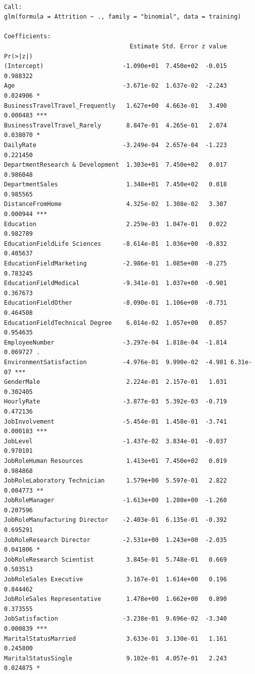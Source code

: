 \documentclass[
  letterpaper,
  DIV=11,
  numbers=noendperiod]{scrreprt}
\begin{document}
\begin{verbatim}

Call:
glm(formula = Attrition ~ ., family = "binomial", data = training)

Coefficients:
                                   Estimate Std. Error z value Pr(>|z|)    
(Intercept)                      -1.090e+01  7.450e+02  -0.015 0.988322    
Age                              -3.671e-02  1.637e-02  -2.243 0.024906 *  
BusinessTravelTravel_Frequently   1.627e+00  4.663e-01   3.490 0.000483 ***
BusinessTravelTravel_Rarely       8.847e-01  4.265e-01   2.074 0.038070 *  
DailyRate                        -3.249e-04  2.657e-04  -1.223 0.221450    
DepartmentResearch & Development  1.303e+01  7.450e+02   0.017 0.986048    
DepartmentSales                   1.348e+01  7.450e+02   0.018 0.985565    
DistanceFromHome                  4.325e-02  1.308e-02   3.307 0.000944 ***
Education                         2.259e-03  1.047e-01   0.022 0.982789    
EducationFieldLife Sciences      -8.614e-01  1.036e+00  -0.832 0.405637    
EducationFieldMarketing          -2.986e-01  1.085e+00  -0.275 0.783245    
EducationFieldMedical            -9.341e-01  1.037e+00  -0.901 0.367673    
EducationFieldOther              -8.090e-01  1.106e+00  -0.731 0.464508    
EducationFieldTechnical Degree    6.014e-02  1.057e+00   0.057 0.954635    
EmployeeNumber                   -3.297e-04  1.818e-04  -1.814 0.069727 .  
EnvironmentSatisfaction          -4.976e-01  9.990e-02  -4.981 6.31e-07 ***
GenderMale                        2.224e-01  2.157e-01   1.031 0.302405    
HourlyRate                       -3.877e-03  5.392e-03  -0.719 0.472136    
JobInvolvement                   -5.454e-01  1.458e-01  -3.741 0.000183 ***
JobLevel                         -1.437e-02  3.834e-01  -0.037 0.970101    
JobRoleHuman Resources            1.413e+01  7.450e+02   0.019 0.984868    
JobRoleLaboratory Technician      1.579e+00  5.597e-01   2.822 0.004773 ** 
JobRoleManager                   -1.613e+00  1.280e+00  -1.260 0.207596    
JobRoleManufacturing Director    -2.403e-01  6.135e-01  -0.392 0.695291    
JobRoleResearch Director         -2.531e+00  1.243e+00  -2.035 0.041806 *  
JobRoleResearch Scientist         3.845e-01  5.748e-01   0.669 0.503513    
JobRoleSales Executive            3.167e-01  1.614e+00   0.196 0.844462    
JobRoleSales Representative       1.478e+00  1.662e+00   0.890 0.373555    
JobSatisfaction                  -3.238e-01  9.696e-02  -3.340 0.000839 ***
MaritalStatusMarried              3.633e-01  3.130e-01   1.161 0.245800    
MaritalStatusSingle               9.102e-01  4.057e-01   2.243 0.024875 *  

\end{verbatim}
\end{document}
